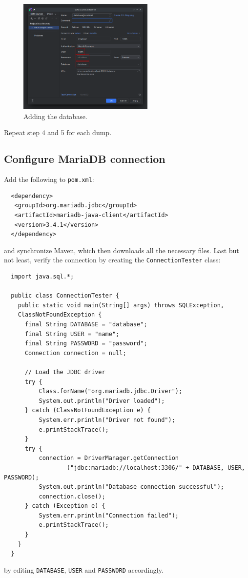 \begin{enumerate}
\begin{figure}[H]
      \centering
      \includegraphics[width=0.6\textwidth]{img/datagrip/datagrip_4.png}
      \caption{Adding the database.}
    \end{figure}
\end{enumerate}

Repeat step 4 and 5 for each dump.

\newpage

\subsection{Configure MariaDB connection}

Add the following to \texttt{pom.xml}:
\begin{verbatim}
  <dependency>
   <groupId>org.mariadb.jdbc</groupId>
   <artifactId>mariadb-java-client</artifactId>
   <version>3.4.1</version>
  </dependency>
\end{verbatim}
and synchronize Maven, which then downloads all the necessary files. Last but not least, verify the connection by creating the \texttt{ConnectionTester} class:
\begin{verbatim}
  import java.sql.*;

  public class ConnectionTester {
    public static void main(String[] args) throws SQLException,
    ClassNotFoundException {
      final String DATABASE = "database";
      final String USER = "name";
      final String PASSWORD = "password";
      Connection connection = null;

      // Load the JDBC driver
      try {
          Class.forName("org.mariadb.jdbc.Driver");
          System.out.println("Driver loaded");
      } catch (ClassNotFoundException e) {
          System.err.println("Driver not found");
          e.printStackTrace();
      }
      try {
          connection = DriverManager.getConnection
                  ("jdbc:mariadb://localhost:3306/" + DATABASE, USER, PASSWORD);
          System.out.println("Database connection successful");
          connection.close();
      } catch (Exception e) {
          System.err.println("Connection failed");
          e.printStackTrace();
      }
    }
  }
\end{verbatim}
by editing \texttt{DATABASE}, \texttt{USER} and \texttt{PASSWORD} accordingly.

